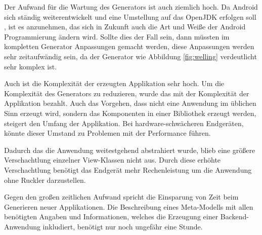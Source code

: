 Der Aufwand für die Wartung des Generators ist auch ziemlich hoch. Da Android sich ständig weiterentwickelt und eine Umstellung auf das OpenJDK erfolgen soll \cite{jdk}, ist es anzunehmen, das sich in Zukunft auch die Art und Weiße der Android Programmierung ändern wird. Sollte dies der Fall sein, dann müssten im kompletten Generator Anpassungen gemacht werden, diese Anpassungen werden sehr zeitaufwändig sein, da der Generator wie Abbildung \ref{fig:welling} verdeutlicht sehr komplex ist.

Auch ist die Komplexität der erzeugten Applikation sehr hoch. Um die Komplexität des Generators zu reduzieren, wurde das mit der Komplexität der Applikation bezahlt. Auch das Vorgehen, dass nicht eine Anwendung im üblichen Sinn erzeugt wird, sondern das Komponenten in einer Bibliothek erzeugt werden, steigert den Umfang der Applikation. Bei hardware-schwächeren Endgeräten, könnte dieser Umstand zu Problemen mit der Performance führen. 

Dadurch das die Anwendung weitestgehend abstrahiert wurde, blieb eine größere Verschachtlung einzelner View-Klassen nicht aus. Durch diese erhöhte Verschachtlung benötigt das Endgerät mehr Rechenleistung um die Anwendung ohne Ruckler darzustellen.

Gegen den großen zeitlichen Aufwand spricht die Einsparung von Zeit beim Generieren neuer Applikationen. Die Beschreibung eines Meta-Modells mit allen benötigten Angaben und Informationen, welches die Erzeugung einer Backend-Anwendung inkludiert, benötigt nur noch ungefähr eine Stunde. 